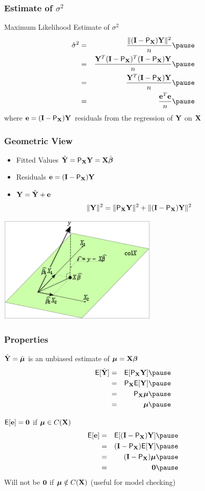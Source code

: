 \documentclass{beamer}
\begin{document}
\begin{frame}
  \frametitle{Estimate of $\sigma^2$}
  Maximum Likelihood Estimate of $\sigma^2$
  \begin{eqnarray*}
    \shat & = & \frac{\| (\I - \P_\X) \Y \|^2}{n} \pause\\
      & = & \frac{\Y^T(\I - \P_\X)^T(\I-\P_\X) \Y }{n} \pause\\
 & = & \frac{ \Y^T(\I - \P_\X) \Y}{n} \pause\\
 & = & \frac{\e^T\e} {n} \pause
  \end{eqnarray*}
where $\mathbf{e} = (\mathbf{I} - \textsf{P}_{\mathbf{X}})\mathbf{Y}$  \alert<5>{residuals} from the regression of $\mathbf{Y}$
on $\mathbf{X}$
\end{frame}
\begin{frame}
  \frametitle{Geometric View}
  \begin{itemize}
  \item Fitted Values  $\hat{\mathbf{Y}} = \textsf{P}_{\mathbf{X}} \mathbf{Y} = \mathbf{X} \hat{\boldsymbol{\beta}}$ \pause
\item Residuals $\mathbf{e} = (\mathbf{I} - \textsf{P}_{\mathbf{X}}) \mathbf{Y}$ \pause
\item $\mathbf{Y} = \hat{\mathbf{Y}} + \mathbf{e}$ \pause
$$\| \mathbf{Y} \|^2 = \| \textsf{P}_{\mathbf{X}} \mathbf{Y} \|^2 +  \| (\mathbf{I}- \textsf{P}_{\mathbf{X}})\mathbf{Y}\|^2  $$ \pause
  \end{itemize}
  \centerline{\includegraphics[height=2in]{OLS}}

\end{frame}

\begin{frame}
  \frametitle{Properties}
 $\hat{\mathbf{Y}} = \hat{\boldsymbol{\mu}}$ is an unbiased estimate of $\boldsymbol{\mu} = \mathbf{X}\boldsymbol{\beta}$
\pause
    \begin{eqnarray*}
      \E [ \Yhat ]  & = & \E [\P_\X \Y ] \pause\\
& = & \P_\X \E[\Y] \pause\\
& = & \P_\X \mub \pause\\
& = & \mub \pause
    \end{eqnarray*}

$\textsf{E}[\mathbf{e}] = \mathbf{0}$ if $\boldsymbol{\mu} \in C(\mathbf{X})$ \pause
\begin{eqnarray*}
      \E [ \e ]  & = & \E [(\I - \P_\X) \Y ] \pause\\
& = & (\I - \P_\X) \E[\Y] \pause\\
& = & (\I - \P_\X) \mub \pause\\
& = & \zero \pause
    \end{eqnarray*}
Will not be $\mathbf{0}$ if $\boldsymbol{\mu} \notin C(\mathbf{X})$  (useful for model checking)

\end{frame}
\end{document}
